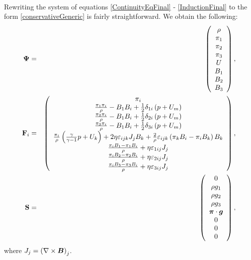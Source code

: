 \paragraph{}
Rewriting the system of equations \ref{ContinuityEqFinal} - \ref{InductionFinal} to the form \ref{conservativeGeneric} is fairly straightforward.
We obtain the following:
\begin{eqnarray}
\mathrm{\mathbf{\Psi}} & = & \left(\begin{array}{c}\rho \\ \pi_1 \\ \pi_2 \\ \pi_3 \\ U \\ B_1 \\ B_2 \\ B_3 \\ \end{array}\right),\\\mathrm{\mathbf{F}}_i & = & \left(\begin{array}{c} \pi_i \\ \frac{\pi_1 \pi_i}{\rho} - B_1 B_i + \frac12 \delta_{1i} \left( p + U_m\right) \\ \frac{\pi_2 \pi_i}{\rho} - B_1 B_i + \frac12 \delta_{2i} \left( p + U_m\right) \\ \frac{\pi_3 \pi_i}{\rho} - B_1 B_i + \frac12 \delta_{3i} \left( p + U_m\right) \\ \frac{\pi_i}{\rho} \left( \frac{\gamma}{\gamma - 1} p + U_k\right) + 2\eta\varepsilon_{ijk} J_j B_k + \frac{2}{\rho} \varepsilon_{ijk} \left( \pi_k B_i - \pi_i B_k\right) B_k  \\ \frac{\pi_i B_1 - \pi_1 B_i}{\rho} + \eta \varepsilon_{1ij} J_j \\ \frac{\pi_i B_2 - \pi_2 B_i}{\rho} + \eta \varepsilon_{2ij} J_j \\ \frac{\pi_i B_3 - \pi_3 B_i}{\rho} + \eta \varepsilon_{3ij} J_j \\ \end{array}\right),\\
\mathrm{\mathbf{S}} & = & \left(\begin{array}{c}0 \\ \rho g_1 \\ \rho g_2 \\ \rho g_3 \\ \mbox{\boldmath $\pi$} \cdot \mbox{\boldmath $g$} \\ 0 \\ 0 \\ 0 \\ \end{array}\right),
\end{eqnarray}
where $J_j = \left(\nabla\times\mbox{\boldmath $B$}\right)_j$.
